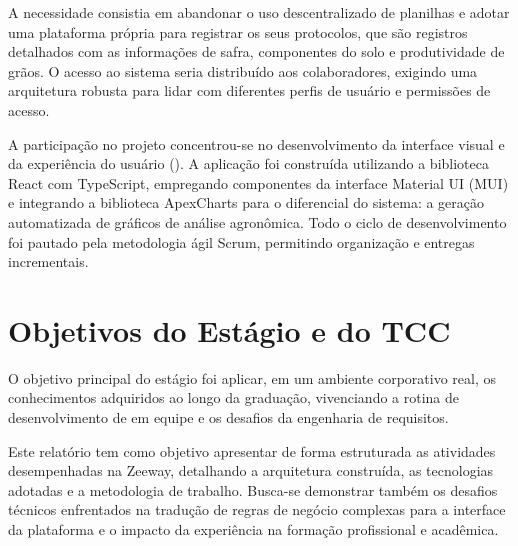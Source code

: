 A necessidade  consistia em abandonar o uso descentralizado de planilhas e adotar uma plataforma própria para registrar os seus protocolos, que são registros detalhados com as informações de safra, componentes do solo e produtividade de grãos. O acesso ao sistema seria distribuído aos colaboradores, exigindo uma arquitetura robusta para lidar com diferentes perfis de usuário e permissões de acesso.

A participação no projeto concentrou-se no desenvolvimento da interface visual e da experiência do usuário (). A aplicação foi construída utilizando a biblioteca React com TypeScript, empregando componentes da interface Material UI (MUI) e integrando a biblioteca ApexCharts para o diferencial do sistema: a geração automatizada de gráficos de análise agronômica. Todo o ciclo de desenvolvimento foi pautado pela metodologia ágil Scrum, permitindo organização e entregas incrementais.

\section{Objetivos do Estágio e do TCC}

O objetivo principal do estágio foi aplicar, em um ambiente corporativo real, os conhecimentos adquiridos ao longo da graduação, vivenciando a rotina de desenvolvimento de  em equipe e os desafios da engenharia de requisitos.

Este relatório tem como objetivo apresentar de forma estruturada as atividades desempenhadas na Zeeway, detalhando a arquitetura  construída, as tecnologias adotadas e a metodologia de trabalho. Busca-se demonstrar também os desafios técnicos enfrentados na tradução de regras de negócio complexas para a interface da plataforma e o impacto da experiência na formação profissional e acadêmica.
